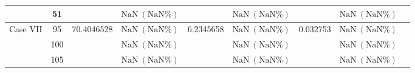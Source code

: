\begin{table}[htbp]
{\begin{tabular}{lclcccccc}
    & 51 & & $\mathrm{NaN}\ (\mathrm{NaN}\%)$ & & $\mathrm{NaN}\ (\mathrm{NaN}\%)$ & & $\mathrm{NaN}\ (\mathrm{NaN}\%)$ \\
    \midrule
    \multirow{3}{*}{Case VII} & 95 & \multirow{3}{*}{70.4046528} & $\mathrm{NaN}\ (\mathrm{NaN}\%)$ & \multirow{3}{*}{6.2345658} & $\mathrm{NaN}\ (\mathrm{NaN}\%)$ & \multirow{3}{*}{0.032753} & $\mathrm{NaN}\ (\mathrm{NaN}\%)$ \\
    & 100 & & $\mathrm{NaN}\ (\mathrm{NaN}\%)$ & & $\mathrm{NaN}\ (\mathrm{NaN}\%)$ & & $\mathrm{NaN}\ (\mathrm{NaN}\%)$ \\
    & 105 & & $\mathrm{NaN}\ (\mathrm{NaN}\%)$ & & $\mathrm{NaN}\ (\mathrm{NaN}\%)$ & & $\mathrm{NaN}\ (\mathrm{NaN}\%)$ \\
    \bottomrule
  \end{tabular}%
  }
\end{table}
